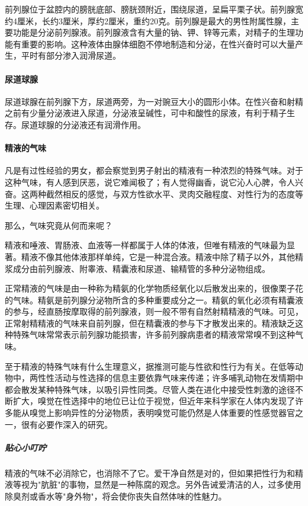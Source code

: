 前列腺位于盆腔内的膀胱底部、膀胱颈附近，围绕尿道，呈扁平栗子状。前列腺宽约4厘米，长约3厘米，厚约2厘米，重约20克。前列腺是最大的男性附属性腺，主要功能是分泌前列腺液。前列腺液含有大量的钠、钾、锌等元素，对精子的生理功能有重要的影响。这种液体由腺体细胞不停地制造和分泌，在性兴奋时可以大量产生，平时有部分渗入润滑尿道。

\paragraph{尿道球腺}

尿道球腺在前列腺下方，尿道两旁，为一对豌豆大小的圆形小体。在性兴奋和射精之前有少量分泌液进入尿道，分泌液呈碱性，可中和酸性的尿液，有利于精子生存。尿道球腺的分泌液还有润滑作用。

\paragraph{精液的气味}

凡是有过性经验的男女，都会察觉到男子射出的精液有一种浓烈的特殊气味。对于这种气味，有人感到厌恶，说它难闻极了；有人觉得幽香，说它沁人心脾，令人兴奋。这两种截然相反的感觉，与双方性欲水平、灵肉交融程度、对性行为的态度等生理、心理因素密切相关。

那么，气味究竟从何而来呢？

精液和唾液、胃肠液、血液等一样都属于人体的体液，但唯有精液的气味最为显著。精液不像其他体液那样单纯，它是一种混合液。精液中除了精子以外，其他精浆成分由前列腺液、附睾液、精囊液和尿道、输精管的多种分泌物组成。

正常精液的气味是由一种称为精氨的化学物质经氧化以后散发出来的，很像栗子花的气味。精氨是前列腺分泌物所含的多种重要成分之一。精氨的氧化必须有精囊液的参与，经直肠按摩取得的前列腺液，则一般不带有自然射精精液的气味。可见，正常射精精液的气味来自前列腺，但在精囊液的参与下才散发出来的。精液缺乏这种特殊气味常常表示前列腺功能损害，许多前列腺病患者的精液常常嗅不到这种气味。

至于精液的特殊气味有什么生理意义，据推测可能与性欲和性行为有关。在低等动物中，两性性活动与性选择的信息主要依靠气味来传递；许多哺乳动物在发情期中都会散发某种特殊气味，以吸引异性同类。尽管人类在进化中接受性刺激的途径不断扩大，嗅觉在性选择中的地位已让位于视觉，但近年来科学家在人体内发现了许多能从嗅觉上影响异性的分泌物质，表明嗅觉可能仍然是人体重要的性感觉器官之一，很有必要作深入的研究。

\subparagraph{贴心小叮咛}

精液的气味不必消除它，也消除不了它。爱干净自然是对的，但如果把性行为和精液等视为"肮脏"的事物，显然是一种陈腐的观念。另外告诫爱清洁的人，过多使用除臭剂或香水等"身外物"，将会使你丧失自然体味的性魅力。

